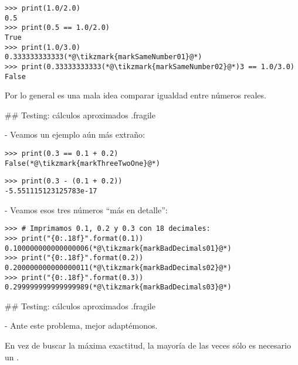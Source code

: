 \begin{lstlisting}
>>> print(1.0/2.0)
0.5
>>> print(0.5 == 1.0/2.0)
True
>>> print(1.0/3.0)
0.333333333333(*@\tikzmark{markSameNumber01}@*)
>>> print(0.33333333333(*@\tikzmark{markSameNumber02}@*)3 == 1.0/3.0)
False
\end{lstlisting}

\pause

\bgnblockidea
Por lo general es una mala idea comparar igualdad entre números reales.
\trmblockidea


## Testing: cálculos aproximados {.fragile}

- Veamos un ejemplo aún más extraño:

\begin{lstlisting}
>>> print(0.3 == 0.1 + 0.2)
False(*@\tikzmark{markThreeTwoOne}@*)
\end{lstlisting}


\pause

\vspace{-2ex}
\begin{lstlisting}
>>> print(0.3 - (0.1 + 0.2))
-5.551115123125783e-17
\end{lstlisting}

- Veamos esos tres números ``más en detalle'':

\begin{lstlisting}
>>> # Imprimamos 0.1, 0.2 y 0.3 con 18 decimales:
>>> print("{0:.18f}".format(0.1))
0.100000000000000006(*@\tikzmark{markBadDecimals01}@*)
>>> print("{0:.18f}".format(0.2))
0.200000000000000011(*@\tikzmark{markBadDecimals02}@*)
>>> print("{0:.18f}".format(0.3))
0.299999999999999989(*@\tikzmark{markBadDecimals03}@*)
\end{lstlisting}



## Testing: cálculos aproximados {.fragile}

- Ante este problema, mejor adaptémonos.

\bgnblockidea
En vez de buscar la máxima exactitud, la mayoría de las veces sólo es necesario un .
\trmblockidea

